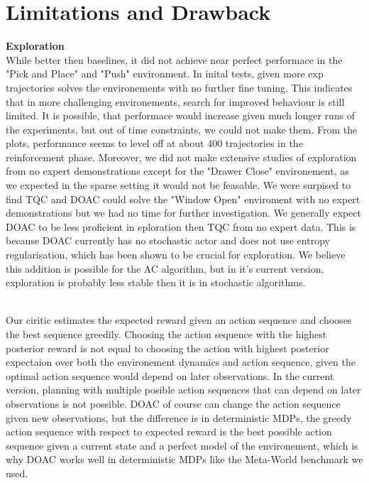 \section{Limitations and Drawback}
\textbf{Exploration}\\
While better then baselines, it did not achieve near perfect performace in the  "Pick and Place" and "Push" environment. 
In inital tests, given more exp trajectories 
solves the environements with no further fine tuning. This indicates that in more challenging environements, search for improved 
behaviour is still limited. It is possible, that performace would increase given much longer runs of the experiments, 
but out of time constraints, we could not make them. From the plots, performance seems to level off at about 400 trajectories in the 
reinforcement phase. 
Moreover, we did not make extensive studies of exploration from no expert demonstrations except for the "Drawer Close" environement, 
as we expected in the sparse setting it would not be 
feasable. We were surpised to find TQC and DOAC could solve the "Window Open" enviroment 
with no expert demonstrations but we had no time for further investigation. We 
generally expect DOAC to be less proficient in eploration then TQC from no expert data. 
This is because DOAC currently has no stochastic actor and does not use entropy regularisation, which has been shown to be crucial for exploration. 
We believe this addition is possible for the AC algorithm, but in it's current version, exploration 
is probably less stable then it is in stochastic algorithms. 

\\
Our ciritic estimates the expected reward given an action sequence and chooses the best sequence greedily. 
Choosing the action sequence with the highest posterior reward is not equal to choosing the action with highest posterior expectaion over
both the environement dynamics and action sequence, given the optimal action sequence would depend on 
later observations. In the current version, planning with multiple posible action sequences that can depend on later observations is not possible. 
DOAC of course can change the action sequence given new observations, but the difference is in deterministic MDPs, the 
greedy action sequence with respect to expected reward is the best possible action sequence given a current state and a perfect model of the 
environement, which is why DOAC works well 
in deterministic MDPs like the Meta-World benchmark we used.